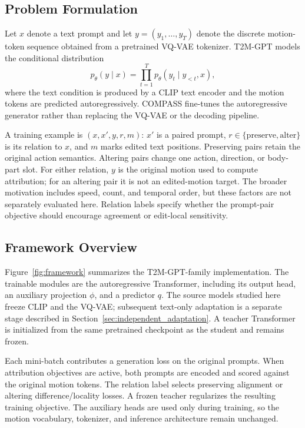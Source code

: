 \subsection{Problem Formulation}
Let $x$ denote a text prompt and let $y=(y_1,\ldots,y_T)$ denote the discrete
motion-token sequence obtained from a pretrained VQ-VAE tokenizer. T2M-GPT
models the conditional distribution
\begin{equation}
    p_{\theta}(y\mid x)=\prod_{t=1}^{T}p_{\theta}(y_t\mid y_{<t}, x),
\end{equation}
where the text condition is produced by a CLIP text encoder and the motion
tokens are predicted autoregressively. COMPASS fine-tunes the autoregressive
generator rather than replacing the VQ-VAE or the decoding pipeline.

A training example is $(x,x',y,r,m)$: $x'$ is a paired prompt,
$r\in\{\mathrm{preserve},\mathrm{alter}\}$ is its relation to $x$, and $m$
marks edited text positions. Preserving pairs retain the original action
semantics. Altering pairs change one action, direction, or body-part slot.
For either relation, $y$ is the original motion used to compute attribution;
for an altering pair it is not an edited-motion target. The broader motivation
includes speed, count, and temporal order, but these factors are not separately
evaluated here. Relation labels specify whether the prompt-pair objective
should encourage agreement or edit-local sensitivity.

\subsection{Framework Overview}
Figure~\ref{fig:framework} summarizes the T2M-GPT-family implementation.
The trainable modules are the autoregressive Transformer, including its output
head, an auxiliary projection $\phi$, and a predictor $q$. The source models
studied here freeze CLIP and the VQ-VAE; subsequent text-only adaptation is a
separate stage described in Section~\ref{sec:independent_adaptation}.
A teacher Transformer is initialized from the same pretrained checkpoint as
the student and remains frozen.

Each mini-batch contributes a generation loss on the original prompts. When
attribution objectives are active, both prompts are encoded and scored against
the original motion tokens. The relation label selects preserving alignment
or altering difference/locality losses. A frozen teacher regularizes the
resulting training objective. The auxiliary heads
are used only during training, so the motion vocabulary, tokenizer, and
inference architecture remain unchanged.

